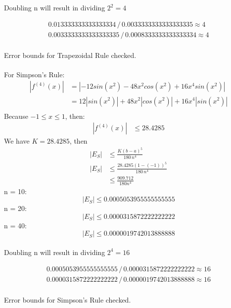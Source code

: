 \documentclass{article}
\begin{document}
    Doubling n will result in dividing $2^{2} = 4$

    \begin{align*}
        0.013333333333333334\,/ \,0.0033333333333333335 \approx 4 \\
        0.0033333333333333335\,/ \, 0.0008333333333333334 \approx 4 \\
    \end{align*}

    Error bounds for Trapezoidal Rule checked.\\\\

    For Simpson's Rule:\\
    \begin{align*}
        |f^{(4)}(x)| &= |-12sin(x^2) - 48x^2cos(x^2) + 16x^4sin(x^2)| \\
        &= 12|sin(x^2)| + 48 x^2 |cos(x^2)| + 16 x^4 |sin(x^2)| \\
    \end{align*}
    Because $-1 \leq x \leq 1$, then:
    \begin{align*}
        |f^{(4)}(x)| & \leq 28.4285
    \end{align*}
    We have $ K = 28.4285$, then
    \begin{align*}
        |E_{S}| & \leq \frac{K(b-a)^5}{180\,n^4} \\
        |E_{S}| & \leq \frac{28.4285(1-(-1))^5}{180\,n^4} \\
        &\leq \frac{909.712}{180n^4}
    \end{align*}
    n = 10: \\
    $$ |E_{S}| \leq 0.0005053955555555555 $$
    n = 20: \\
    $$ |E_{S}| \leq 0.0000315872222222222 $$
    n = 40: \\
    $$ |E_{S}| \leq 0.0000019742013888888 $$ \\

    Doubling n will result in dividing $2^{4} = 16$

    \begin{align*}
        0.0005053955555555555\,/ \,0.0000315872222222222 \approx 16 \\
        0.0000315872222222222\,/ \, 0.0000019742013888888 \approx 16 \\
    \end{align*}

    Error bounds for Simpson's Rule checked.\\\\\\\\\\\\
\end{document}
